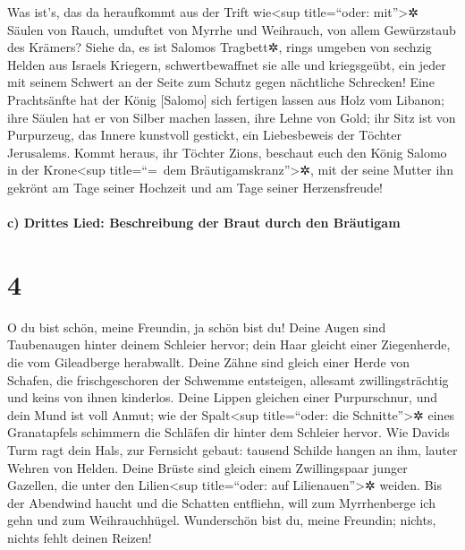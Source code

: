 Was ist's, das da heraufkommt aus der Trift
wie\textless sup title=``oder: mit''\textgreater✲ Säulen von Rauch,
umduftet von Myrrhe und Weihrauch, von allem Gewürzstaub des Krämers?
Siehe da, es ist Salomos Tragbett✲, rings umgeben von
sechzig Helden aus Israels Kriegern, schwertbewaffnet sie
alle und kriegsgeübt, ein jeder mit seinem Schwert an der Seite zum
Schutz gegen nächtliche Schrecken! Eine Prachtsänfte hat
der König {[}Salomo{]} sich fertigen lassen aus Holz vom Libanon;
ihre Säulen hat er von Silber machen lassen, ihre Lehne
von Gold; ihr Sitz ist von Purpurzeug, das Innere kunstvoll gestickt,
ein Liebesbeweis der Töchter Jerusalems. Kommt heraus,
ihr Töchter Zions, beschaut euch den König Salomo in der
Krone\textless sup title=``=~dem Bräutigamskranz''\textgreater✲, mit der
seine Mutter ihn gekrönt am Tage seiner Hochzeit und am Tage seiner
Herzensfreude!

\hypertarget{c-drittes-lied-beschreibung-der-braut-durch-den-bruxe4utigam}{%
\paragraph{c) Drittes Lied: Beschreibung der Braut durch den
Bräutigam}\label{c-drittes-lied-beschreibung-der-braut-durch-den-bruxe4utigam}}

\hypertarget{section-3}{%
\section{4}\label{section-3}}

O du bist schön, meine Freundin, ja schön bist du! Deine
Augen sind Taubenaugen hinter deinem Schleier hervor; dein Haar gleicht
einer Ziegenherde, die vom Gileadberge herabwallt. Deine
Zähne sind gleich einer Herde von Schafen, die frischgeschoren der
Schwemme entsteigen, allesamt zwillingsträchtig und keins von ihnen
kinderlos. Deine Lippen gleichen einer Purpurschnur, und
dein Mund ist voll Anmut; wie der Spalt\textless sup title=``oder: die
Schnitte''\textgreater✲ eines Granatapfels schimmern die Schläfen dir
hinter dem Schleier hervor. Wie Davids Turm ragt dein
Hals, zur Fernsicht gebaut: tausend Schilde hangen an ihm, lauter Wehren
von Helden. Deine Brüste sind gleich einem Zwillingspaar
junger Gazellen, die unter den Lilien\textless sup title=``oder: auf
Lilienauen''\textgreater✲ weiden. Bis der Abendwind haucht
und die Schatten entfliehn, will zum Myrrhenberge ich gehn und zum
Weihrauchhügel. Wunderschön bist du, meine Freundin;
nichts, nichts fehlt deinen Reizen!

